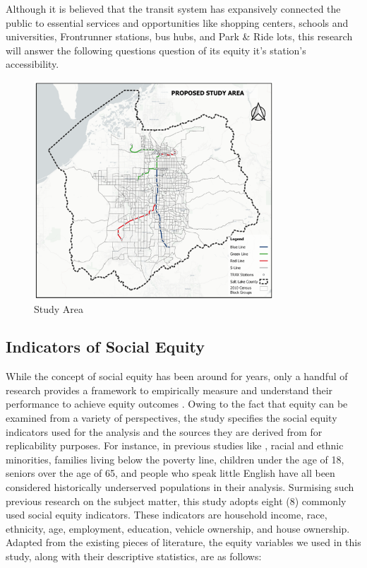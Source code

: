 \documentclass[numbered]{trbunofficial}
\begin{document}
Although it is believed that the transit system has expansively connected the public to essential services and opportunities like shopping centers, schools and universities, Frontrunner stations, bus hubs, and Park \& Ride lots, this research will answer the following questions question of its equity it's station's accessibility.

\begin{figure}[!ht]
  \centering
  \includegraphics[width=0.8\textwidth]{Study Area.png}
  \caption{Study Area}\label{fig:trial}
\end{figure}

\subsection{Indicators of Social Equity}
While the concept of social equity has been around for years, only a handful of research provides a framework to empirically measure and understand their performance to achieve equity outcomes \cite{Appleyard2019}. Owing to the fact that equity can be examined from a variety of perspectives, the study specifies the social equity indicators used for the analysis and the sources they are derived from for replicability purposes. For instance, in previous studies like \citep{Dill2009}, racial and ethnic minorities, families living below the poverty line, children under the age of 18, seniors over the age of 65, and people who speak little English have all been considered historically underserved populations in their analysis. Surmising such previous research on the subject matter, this study adopts eight (8) commonly used social equity indicators. These indicators are household income, race, ethnicity, age, employment, education, vehicle ownership, and house ownership. Adapted from the existing pieces of literature, the equity variables we used in this study, along with their descriptive statistics, are as follows:
\end{document}
